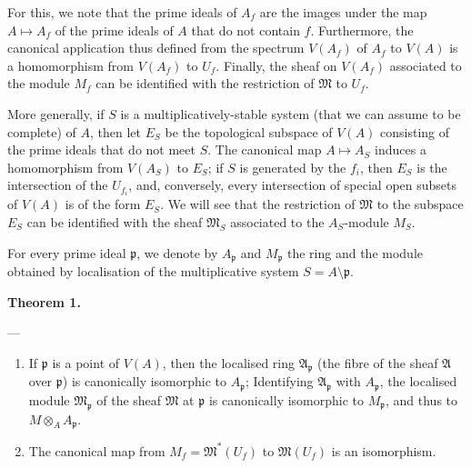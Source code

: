 \documentclass[british]{article}
\providecommand{\tightlist}{%
\setlength{\itemsep}{0pt}\setlength{\parskip}{0pt}}
\newenvironment{itenv}[1]
  {\phantomsection\par\smallskip\noindent\textbf{#1.}\itshape}
  {\par\smallskip}
\newcommand{\oldpage}[1]{\marginpar{\footnotesize$\Big\vert$ \textit{p.~#1}}}
\begin{document}
For this, we note that the prime ideals of \(A_f\) are the images under
the map \(A\mapsto A_f\) of the prime ideals of \(A\) that do not
contain \(f\). Furthermore, the canonical application thus defined from
the spectrum \(V(A_f)\) of \(A_f\) to \(V(A)\) is a homomorphism from
\(V(A_f)\) to \(U_f\). Finally, the sheaf on \(V(A_f)\) associated to
the module \(M_f\) can be identified with the restriction of
\(\mathfrak{M}\) to \(U_f\).

More generally, if \(S\) is a multiplicatively-stable system (that we
can assume to be complete) of \(A\), then let \(E_S\) be the topological
subspace of \(V(A)\) consisting of the prime ideals that do not meet
\(S\). \oldpage{1-05} The canonical map \(A\mapsto A_S\) induces a
homomorphism from \(V(A_S)\) to \(E_S\); if \(S\) is generated by the
\(f_i\), then \(E_S\) is the intersection of the \(U_{f_i}\), and,
conversely, every intersection of special open subsets of \(V(A)\) is of
the form \(E_S\). We will see that the restriction of \(\mathfrak{M}\)
to the subspace \(E_S\) can be identified with the sheaf
\(\mathfrak{M}_S\) associated to the \(A_S\)-module \(M_S\).

For every prime ideal \(\mathfrak{p}\), we denote by \(A_\mathfrak{p}\)
and \(M_\mathfrak{p}\) the ring and the module obtained by localisation
of the multiplicative system \(S=A\setminus\mathfrak{p}\).

\protect{}\label{theorem-1}
\begin{itenv}{Theorem 1}

---

\begin{enumerate}
\def\labelenumi{\alph{enumi}.}
\tightlist
\item
  If \(\mathfrak{p}\) is a point of \(V(A)\), then the localised ring
  \(\mathfrak{A}_\mathfrak{p}\) (the fibre of the sheaf \(\mathfrak{A}\)
  over \(\mathfrak{p}\)) is canonically isomorphic to
  \(A_\mathfrak{p}\); Identifying \(\mathfrak{A}_\mathfrak{p}\) with
  \(A_\mathfrak{p}\), the localised module \(\mathfrak{M}_\mathfrak{p}\)
  of the sheaf \(\mathfrak{M}\) at \(\mathfrak{p}\) is canonically
  isomorphic to \(M_\mathfrak{p}\), and thus to
  \(M\otimes_A A_\mathfrak{p}\).
\item
  The canonical map from \(M_f=\mathfrak{M}^*(U_f)\) to
  \(\mathfrak{M}(U_f)\) is an isomorphism.
\end{enumerate}

\end{itenv}
\end{document}
